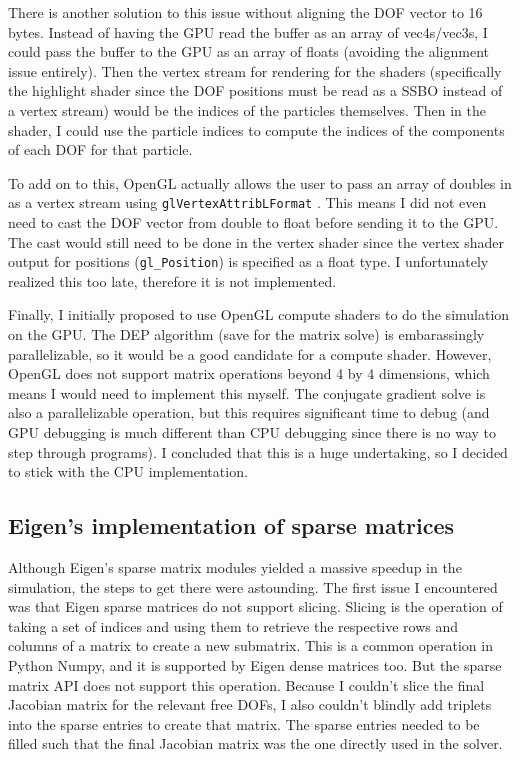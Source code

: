 \documentclass[letterpaper, 10 pt, conference]{ieeeconf}  %
\begin{document}
        There is another solution to this issue without aligning the DOF vector to 16 bytes. Instead of having the GPU read the buffer as an array of vec4s/vec3s, I could pass the buffer to the GPU as an array of floats (avoiding the alignment issue entirely). Then the vertex stream for rendering for the shaders (specifically the highlight shader since the DOF positions must be read as a SSBO instead of a vertex stream) would be the indices of the particles themselves. Then in the shader, I could use the particle indices to compute the indices of the components of each DOF for that particle. 

        To add on to this, OpenGL actually allows the user to pass an array of doubles in as a vertex stream using \texttt{glVertexAttribLFormat} \cite{opengl_documentation} . This means I did not even need to cast the DOF vector from double to float before sending it to the GPU. The cast would still need to be done in the vertex shader since the vertex shader output for positions (\texttt{gl\_Position}) is specified as a float type. I unfortunately realized this too late, therefore it is not implemented. 

        Finally, I initially proposed to use OpenGL compute shaders to do the simulation on the GPU. The DEP algorithm (save for the matrix solve) is embarassingly parallelizable, so it would be a good candidate for a compute shader. However, OpenGL does not support matrix operations beyond 4 by 4 dimensions, which means I would need to implement this myself. The conjugate gradient solve is also a parallelizable operation, but this requires significant time to debug (and GPU debugging is much different than CPU debugging since there is no way to step through programs). I concluded that this is a huge undertaking, so I decided to stick with the CPU implementation.

\subsection{Eigen's implementation of sparse matrices}
        Although Eigen's sparse matrix modules yielded a massive speedup in the simulation, the steps to get there were astounding. The first issue I encountered was that Eigen sparse matrices do not support slicing. Slicing is the operation of taking a set of indices and using them to retrieve the respective rows and columns of a matrix to create a new submatrix. This is a common operation in Python Numpy, and it is supported by Eigen dense matrices too. But the sparse matrix API does not support this operation. Because I couldn't slice the final Jacobian matrix for the relevant free DOFs, I also couldn't blindly add triplets into the sparse entries to create that matrix. The sparse entries needed to be filled such that the final Jacobian matrix was the one directly used in the solver. 
\end{document}
